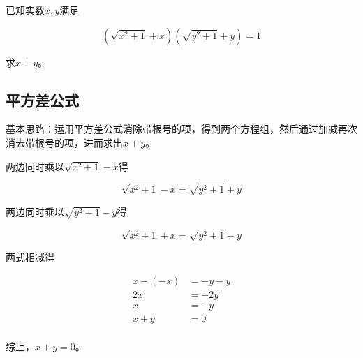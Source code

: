 

已知实数$x, y$满足

\[ \left(\sqrt{x^2 + 1} + x\right)\left(\sqrt{y^2 + 1} + y\right) = 1 \]

求$x + y$。


\subsection{平方差公式}

基本思路：运用平方差公式消除带根号的项，得到两个方程组，然后通过加减再次消去带根号的项，进而求出$x + y$。

两边同时乘以$\sqrt{x^2 + 1} - x$得

\[ \sqrt{x^2 + 1} - x = \sqrt{y^2 + 1} + y \]

两边同时乘以$\sqrt{y^2 + 1} - y$得

\[ \sqrt{x^2 + 1} + x = \sqrt{y^2 + 1} - y \]

两式相减得

\begin{align*}
  x - (-x) &= -y - y \\
  2x &= -2y \\
  x &= -y \\
  x + y &= 0 \\
\end{align*}

综上，$x + y = 0$。
